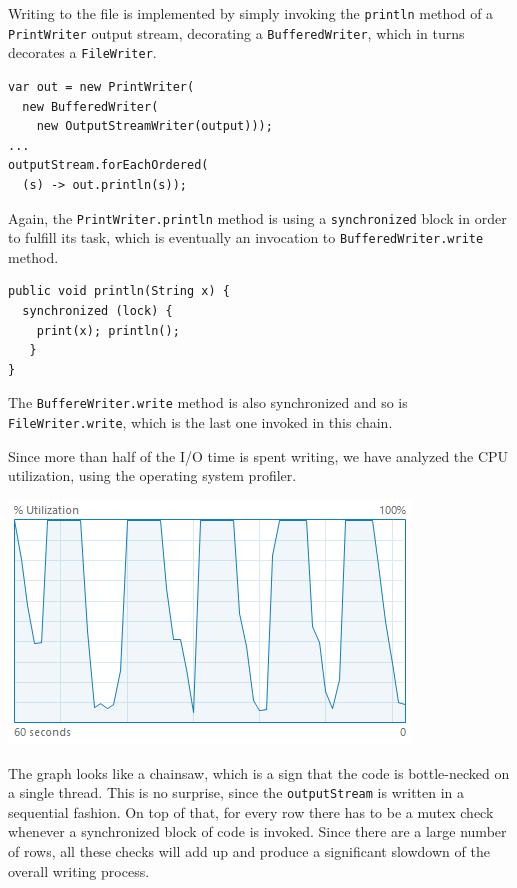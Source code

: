 \documentclass[a4paper,twoside]{article}
\begin{document}
{Writing to the file is implemented by simply invoking the {\texttt{println}} method of a {\texttt{PrintWriter}} output stream, decorating a {\texttt{BufferedWriter}}, which in turns decorates a {\texttt{FileWriter}}.
\begin{verbatim}
var out = new PrintWriter(
  new BufferedWriter(
    new OutputStreamWriter(output)));
...    
outputStream.forEachOrdered(
  (s) -> out.println(s));
\end{verbatim}

Again, the {\texttt{PrintWriter.println}} method is using a {\texttt{synchronized}} block in order to fulfill its task, which is eventually an invocation to {\texttt{BufferedWriter.write}} method.
\begin{verbatim}
public void println(String x) {
  synchronized (lock) {
    print(x); println();
   }
}
\end{verbatim}
The {\texttt{BuffereWriter.write}} method is also synchronized and so is {\texttt{FileWriter.write}}, which is the last one invoked in this chain.

Since more than half of the I/O time is spent writing, we have analyzed the CPU utilization, using the operating system profiler.
\begin{center}
\includegraphics[scale=0.5]{images/cpu_original.png}
\end{center}
The graph looks like a chainsaw, which is a sign that the code is bottle-necked on a single thread.
This is no surprise, since the {\texttt{outputStream}} is written in a sequential fashion.
On top of that, for every row there has to be a mutex check whenever a synchronized block of code is invoked.
Since there are a large number of rows, all these checks will add up and produce a significant slowdown of the overall writing process.

}
\end{document}
